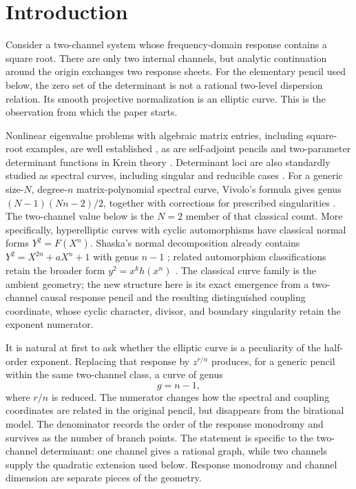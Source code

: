 \documentclass[11pt,reqno]{amsart}
\theoremstyle{remark}
\begin{document}
\maketitle
\enlargethispage{2pt}
\tableofcontents

\section{Introduction}\label{sec:introduction}

Consider a two-channel system whose frequency-domain response contains a
square root.  There are only two internal channels, but analytic continuation
around the origin exchanges two response sheets.  For the elementary pencil
used below, the zero set of the determinant is not a rational two-level
dispersion relation.  Its smooth projective normalization is an elliptic
curve.  This is the observation from which the paper starts.

Nonlinear eigenvalue problems with algebraic matrix entries, including
square-root examples, are well established \cite{GuttelTisseur2017}, as are
self-adjoint pencils and two-parameter determinant functions in Krein
theory \cite{KollarMiller2014}.  Determinant loci are also standardly studied
as spectral curves, including singular and reducible cases
\cite{Izosimov2015}.  For a generic size-$N$, degree-$n$ matrix-polynomial
spectral curve, Vivolo's formula gives genus
$(N-1)(Nn-2)/2$, together with corrections for prescribed singularities
\cite{Vivolo2000}.  The two-channel value below is the $N=2$ member of
that classical count.  More specifically, hyperelliptic curves with cyclic
automorphisms have classical normal forms $Y^2=F(X^n)$.  Shaska's normal
decomposition already contains $Y^2=X^{2n}+aX^n+1$ with genus $n-1$
\cite{Shaska2003}; related automorphism classifications retain the broader
form $y^2=x^kh(x^n)$ \cite{GutierrezShaska2005,MuellerPink2022}.  The
classical curve family is the ambient geometry; the new structure here is
its exact emergence from a two-channel causal response pencil and the
resulting distinguished coupling coordinate, whose cyclic character,
divisor, and boundary singularity retain the exponent numerator.

It is natural at first to ask whether the elliptic curve is a peculiarity of
the half-order exponent.  Replacing that response by $z^{r/n}$ produces, for
a generic pencil within the same two-channel class, a curve of genus
\begin{equation}\label{eq:intro-genus}
 g=n-1,
\end{equation}
where $r/n$ is reduced.  The numerator changes how the spectral and coupling
coordinates are related in the original pencil, but disappears from the
birational model.  The denominator records the order of the response monodromy and
survives as the number of branch points.  The statement is specific to the
two-channel determinant: one channel gives a rational graph, while two
channels supply the quadratic extension used below.  Response monodromy and
channel dimension are separate pieces of the geometry.
\end{document}
